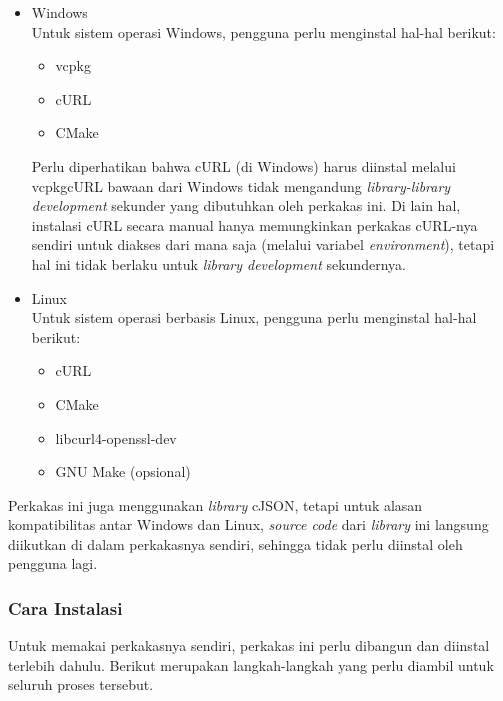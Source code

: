 \begin{itemize}
	\item Windows \\
	Untuk sistem operasi Windows, pengguna perlu menginstal hal-hal berikut:
	
	\begin{itemize}
		\item vcpkg
		\item cURL
		\item CMake
	\end{itemize}
	\newpage\vspace*{-1.5em} %
	Perlu diperhatikan bahwa cURL (di Windows) harus diinstal melalui vcpkg\textemdash cURL bawaan dari Windows tidak mengandung \textit{library-library development} sekunder yang dibutuhkan oleh perkakas ini. Di lain hal, instalasi cURL secara manual hanya memungkinkan perkakas cURL-nya sendiri untuk diakses dari mana saja (melalui variabel \textit{environment}), tetapi hal ini tidak berlaku untuk \textit{library development} sekundernya.
	
	\item Linux \\
	Untuk sistem operasi berbasis Linux, pengguna perlu menginstal hal-hal berikut:
	
	\begin{itemize}
		\item cURL
		\item CMake
		\item libcurl4-openssl-dev
		\item GNU Make (opsional)
	\end{itemize}
	
\end{itemize}
\noindent
Perkakas ini juga menggunakan \textit{library} cJSON, tetapi untuk alasan kompatibilitas antar Windows dan Linux, \textit{source code} dari \textit{library} ini langsung diikutkan di dalam perkakasnya sendiri, sehingga tidak perlu diinstal oleh pengguna lagi.
\vspace*{-0.5em} %
\subsubsection{Cara Instalasi}
\label{sec:testing-implementation-installation-howto}

Untuk memakai perkakasnya sendiri, perkakas ini perlu dibangun dan diinstal terlebih dahulu. Berikut merupakan langkah-langkah yang perlu diambil untuk seluruh proses tersebut.

